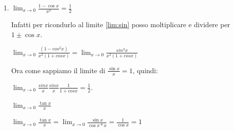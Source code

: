 \begin{enumerate}[label=\textbf{\arabic*})]
\begin{dimostration}
        Ritornando alla formula \ref{eq:lim_notevole1} abbiamo ottenuto che $\sin x\leq x\leq\tan x$. Volendo ricondurre l'uguaglianza nella forma $\frac{\sin x}{x}$ posso dividere per $\sin x$ e ne derivo:
        \begin{equation*}
            1\leq\frac{x}{\sin x}\leq\frac{1}{\cos x}
        \end{equation*}
        Non mi resta che elevare alla -1 e invertire il verso della disequazione:
        \begin{equation*}
            \cos x\leq\sin x\leq 1    
        \end{equation*}
        
        Considero infine $\cos x=f(x), \frac{\sin x}{x}=g(x), 1=h(x)$ e applico il teorema dei carabinieri (vedi Sezione \ref{td_carabinieri}).
        
        \begin{equation*}
            \lim_{x\to 0}\cos x=1\hspace{0,5cm}\lim_{x\to 0}1=1
        \end{equation*}
        Quindi:
        \begin{equation*}
            \lim_{x\to 0}\frac{\sin x}{x}=1
        \end{equation*}
        
    \end{dimostration}
    
    Da questo limite derivano, attraverso piccole manipolazioni algerbriche, tutti gli altri limiti notevoli trigonometrici.
    Uno tra questi è:
    
    \item $\lim_{x\to 0}\frac{1-\cos x}{x^2}=\frac{1}{2}$
    
    Infatti per ricondurlo al limite \ref{lim:sin} posso moltiplicare e dividere per $1\pm\cos x$.
    
    $\lim_{x\to 0}\frac{(1-cos^{2}x)}{x^{2}(1+cosx)}= \lim_{x\to 0}\frac{sin^{2}x}{x^{2}(1+cosx)}$
    
    Ora come sappiamo il limite di $\frac{\sin x}{x}=1$, quindi:
    
    $\lim_{x\to 0} \frac{sinx}{x}\frac{sinx}{x}\frac{1}{1+cosx}=\frac{1}{2}$.
    \begin{example}
        $\lim_{x\to 0}\frac{\tan x}{x}$
        
        $\lim_{x\to 0}\frac{\tan x}{x}=\lim_{x\to 0}\frac{\sin x}{\cos x*x}=\frac{1}{\cos x}=1$
    \end{example}
\end{enumerate}
